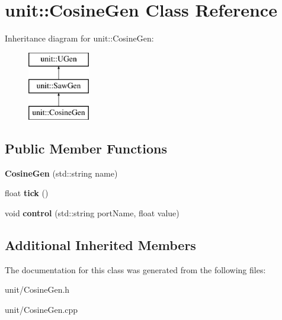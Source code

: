 \hypertarget{classunit_1_1CosineGen}{}\section{unit\+:\+:Cosine\+Gen Class Reference}
\label{classunit_1_1CosineGen}
Inheritance diagram for unit\+:\+:Cosine\+Gen\+:\begin{figure}[H]
\begin{center}
\leavevmode
\includegraphics[height=3.000000cm]{classunit_1_1CosineGen}
\end{center}
\end{figure}
\subsection*{Public Member Functions}
\begin{DoxyCompactItemize}
\item 
{\bfseries Cosine\+Gen} (std\+::string name)\hypertarget{classunit_1_1CosineGen_a1eb4aa0471f337e95653d91e550f58cb}{}\label{classunit_1_1CosineGen_a1eb4aa0471f337e95653d91e550f58cb}

\item 
float {\bfseries tick} ()\hypertarget{classunit_1_1CosineGen_a4c1ceffaf70b5eae5c4153ee4b93c001}{}\label{classunit_1_1CosineGen_a4c1ceffaf70b5eae5c4153ee4b93c001}

\item 
void {\bfseries control} (std\+::string port\+Name, float value)\hypertarget{classunit_1_1CosineGen_a15411f97b09516de2bf85327615f1784}{}\label{classunit_1_1CosineGen_a15411f97b09516de2bf85327615f1784}

\end{DoxyCompactItemize}
\subsection*{Additional Inherited Members}


The documentation for this class was generated from the following files\+:\begin{DoxyCompactItemize}
\item 
unit/Cosine\+Gen.\+h\item 
unit/Cosine\+Gen.\+cpp\end{DoxyCompactItemize}
